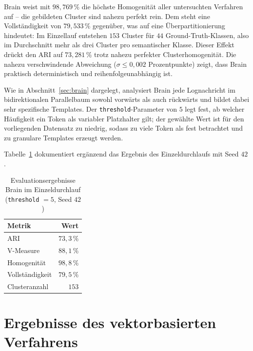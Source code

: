 Brain weist mit $98{,}769\,\%$ die höchste Homogenität aller untersuchten
Verfahren auf -- die gebildeten Cluster sind nahezu perfekt rein. Dem steht
eine Vollständigkeit von $79{,}533\,\%$ gegenüber, was auf eine
Überpartitionierung hindeutet: Im Einzellauf entstehen $153$ Cluster für
$44$ Ground-Truth-Klassen, also im Durchschnitt mehr als drei Cluster pro
semantischer Klasse. Dieser Effekt drückt den ARI auf $73{,}281\,\%$ trotz
nahezu perfekter Clusterhomogenität. Die nahezu verschwindende Abweichung
($\sigma \leq 0{,}002$ Prozentpunkte) zeigt, dass Brain praktisch
deterministisch und reihenfolgeunabhängig ist.

Wie in Abschnitt~\ref{sec:brain} dargelegt, analysiert Brain jede Lognachricht im
bidirektionalen Parallelbaum sowohl vorwärts als auch rückwärts und bildet dabei sehr
spezifische Templates. Der \texttt{threshold}-Parameter von $5$ legt fest, ab welcher
Häufigkeit ein Token als variabler Platzhalter gilt; der gewählte Wert ist für den
vorliegenden Datensatz zu niedrig, sodass zu viele Token als fest betrachtet und zu
granulare Templates erzeugt werden.

Tabelle~\ref{tab:eval:brain:single} dokumentiert ergänzend das Ergebnis des
Einzeldurchlaufs mit Seed $42$.

\begin{table}[h]
    \centering
    \caption{Evaluationsergebnisse Brain im Einzeldurchlauf (\texttt{threshold} $= 5$, Seed $42$)}
    \label{tab:eval:brain:single}
    \begin{tabular}{lr}
        \toprule
        Metrik & Wert \\
        \midrule
        ARI             & $73{,}3\,\%$ \\
        V-Measure       & $88{,}1\,\%$ \\
        Homogenität     & $98{,}8\,\%$ \\
        Vollständigkeit & $79{,}5\,\%$ \\
        \midrule
        Clusteranzahl   & $153$ \\
        \bottomrule
    \end{tabular}
\end{table}

\section{Ergebnisse des vektorbasierten Verfahrens}
\label{sec:eval:vector}

